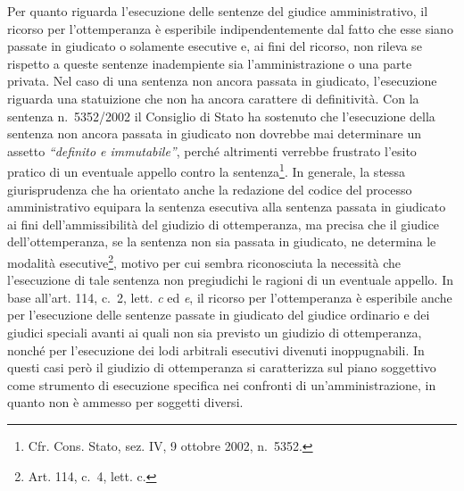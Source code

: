 \documentclass[12pt,it,a4paper,]{report}
\begin{document}
Per quanto riguarda l'esecuzione delle sentenze del giudice
amministrativo, il ricorso per l'ottemperanza è esperibile
indipendentemente dal fatto che esse siano passate in giudicato o
solamente esecutive e, ai fini del ricorso, non rileva se rispetto a
queste sentenze inadempiente sia l'amministrazione o una parte privata.
Nel caso di una sentenza non ancora passata in giudicato, l'esecuzione
riguarda una statuizione che non ha ancora carattere di definitività.
Con la sentenza n.~5352/2002 il Consiglio di Stato ha sostenuto che
l'esecuzione della sentenza non ancora passata in giudicato non dovrebbe
mai determinare un assetto \emph{``definito e immutabile''}, perché
altrimenti verrebbe frustrato l'esito pratico di un eventuale appello
contro la sentenza\footnote{Cfr. Cons. Stato, sez. IV, 9 ottobre 2002,
  n.~5352.}. In generale, la stessa giurisprudenza che ha orientato
anche la redazione del codice del processo amministrativo equipara la
sentenza esecutiva alla sentenza passata in giudicato ai fini
dell'ammissibilità del giudizio di ottemperanza, ma precisa che il
giudice dell'ottemperanza, se la sentenza non sia passata in giudicato,
ne determina le modalità esecutive\footnote{Art. 114, c.~4, lett. c.},
motivo per cui sembra riconosciuta la necessità che l'esecuzione di tale
sentenza non pregiudichi le ragioni di un eventuale appello. In base
all'art. 114, c.~2, lett. \emph{c} ed \emph{e}, il ricorso per
l'ottemperanza è esperibile anche per l'esecuzione delle sentenze
passate in giudicato del giudice ordinario e dei giudici speciali avanti
ai quali non sia previsto un giudizio di ottemperanza, nonché per
l'esecuzione dei lodi arbitrali esecutivi divenuti inoppugnabili. In
questi casi però il giudizio di ottemperanza si caratterizza sul piano
soggettivo come strumento di esecuzione specifica nei confronti di
un'amministrazione, in quanto non è ammesso per soggetti diversi.
\end{document}
